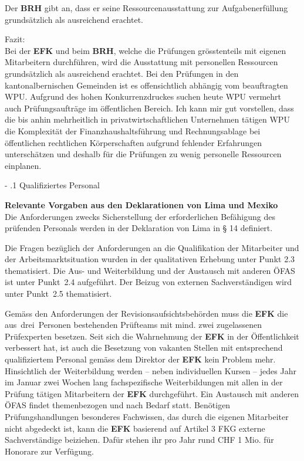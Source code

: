 \documentclass[10pt]{article}
\makeatletter
\renewcommand\subparagraph{\@startsection{subparagraph}{4}{0mm}{-\baselineskip}{.1\baselineskip}{\normalfont\normalsize\bfseries}}
\renewcommand\subparagraph{%
\@startsection{subparagraph}{4}{0mm}%
{-\baselineskip}%
{.1\baselineskip}%
{\normalfont\normalsize\bfseries}}
\makeatother
\begin{document}
Der \textbf{BRH} gibt an, dass er seine Ressourcenausstattung zur Aufgabenerfüllung grund­sätzlich als ausreichend erachtet.

Fazit:\\
Bei der \textbf{EFK} und beim \textbf{BRH}, welche die Prüfungen grösstenteils mit eigenen Mitarbeitern durchführen, wird die Ausstattung mit personellen Ressourcen grundsätzlich als ausreichend erachtet. Bei den Prüfungen in den kantonalbernischen Gemeinden ist es offensichtlich abhängig vom beauftragten WPU. Aufgrund des hohen Konkurrenzdruckes suchen heute WPU vermehrt auch Prüfungsaufträge im öffentlichen Bereich. Ich kann mir gut vorstellen, dass die bis anhin mehrheitlich in privatwirtschaftlichen Unternehmen tätigen WPU die Komplexität der Finanzhaushaltsführung und Rechnungsablage bei öffentlichen rechtlichen Körperschaften aufgrund fehlender Erfahrungen unterschätzen und deshalb für die Prüfungen zu wenig personelle Ressourcen einplanen.

\subparagraph{Qualifiziertes Personal}\label{subpara:qualifiziertes_personal}
\begin{shaded}
\textbf{Relevante Vorgaben aus den Deklarationen von Lima und Mexiko}\\
Die Anforderungen zwecks Sicherstellung der erforderlichen Befähigung des prüfenden Personals werden in der Deklaration von Lima in § 14 definiert.

\end{shaded}
Die Fragen bezüglich der Anforderungen an die Qualifikation der Mitarbeiter und der Arbeitsmarktsituation wurden in der qualitativen Erhebung unter Punkt 2.3 thematisiert. Die Aus- und Weiterbildung und der Austausch mit anderen ÖFAS ist unter Punkt~2.4 aufgeführt. Der Beizug von externen Sachverständigen wird unter Punkt~2.5 thematisiert.

Gemäss den Anforderungen der Revisionsaufsichtsbehörden muss die \textbf{EFK} die aus~drei~Personen bestehenden Prüfteams mit mind. zwei zugelassenen Prüfexperten besetzen. Seit sich die Wahrnehmung der \textbf{EFK} in der Öffentlichkeit verbessert hat, ist auch die Besetzung von vakanten Stellen mit entsprechend qualifiziertem Personal gemäss dem Direktor der \textbf{EFK} kein Problem mehr. Hinsichtlich der Weiterbildung werden -- neben individuellen Kursen -- jedes Jahr im Januar zwei Wochen lang fachspezifische Weiterbildungen mit allen in der Prüfung tätigen Mitarbeitern der \textbf{EFK} durchgeführt. Ein Austausch mit anderen ÖFAS findet themenbezogen und nach Bedarf statt. Benötigen Prüfungshandlungen besonderes Fachwissen, das durch die eigenen Mitarbeiter nicht abgedeckt ist, kann die \textbf{EFK} basierend auf Artikel 3 FKG externe Sachverständige beiziehen. Dafür stehen ihr pro Jahr rund CHF 1 Mio. für Honorare zur Verfügung.
\end{document}

